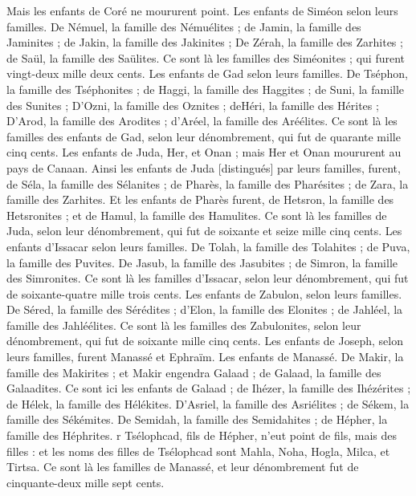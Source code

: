 \begin{multicols}{2}
Mais les enfants de Coré ne moururent point.
Les enfants de Siméon selon leurs familles. De Némuel, la famille des Némuélites ; de Jamin, la famille des Jaminites ; de Jakin, la famille des Jakinites ;
De Zérah, la famille des Zarhites ; de Saül, la famille des Saülites.
Ce sont là les familles des Siméonites ; qui furent vingt-deux mille deux cents.
Les enfants de Gad selon leurs familles. De Tséphon, la famille des Tséphonites ; de Haggi, la famille des Haggites ; de Suni, la famille des Sunites ;
D'Ozni, la famille des Oznites ; deHéri, la famille des Hérites ;
D'Arod, la famille des Arodites ; d'Aréel, la famille des Aréélites.
Ce sont là les familles des enfants de Gad, selon leur dénombrement, qui fut de quarante mille cinq cents.
Les enfants de Juda, Her, et Onan ; mais Her et Onan moururent au pays de Canaan.
Ainsi les enfants de Juda [distingués] par leurs familles, furent, de Séla, la famille des Sélanites ; de Pharès, la famille des Pharésites ; de Zara, la famille des Zarhites.
Et les enfants de Pharès furent, de Hetsron, la famille des Hetsronites ; et de Hamul, la famille des Hamulites.
Ce sont là les familles de Juda, selon leur dénombrement, qui fut de soixante et seize mille cinq cents.
Les enfants d'Issacar selon leurs familles. De Tolah, la famille des Tolahites ; de Puva, la famille des Puvites.
De Jasub, la famille des Jasubites ; de Simron, la famille des Simronites.
Ce sont là les familles d'Issacar, selon leur dénombrement, qui fut de soixante-quatre mille trois cents.
Les enfants de Zabulon, selon leurs familles. De Séred, la famille des Sérédites ; d'Elon, la famille des Elonites ; de Jahléel, la famille des Jahléélites.
Ce sont là les familles des Zabulonites, selon leur dénombrement, qui fut de soixante mille cinq cents.
Les enfants de Joseph, selon leurs familles, furent Manassé et Ephraïm.
Les enfants de Manassé. De Makir, la famille des Makirites ; et Makir engendra Galaad ; de Galaad, la famille des Galaadites.
Ce sont ici les enfants de Galaad ; de Ihézer, la famille des Ihézérites ; de Hélek, la famille des Hélékites.
D'Asriel, la famille des Asriélites ; de Sékem, la famille des Sékémites.
De Semidah, la famille des Semidahites ; de Hépher, la famille des Héphrites.
r Tsélophcad, fils de Hépher, n'eut point de fils, mais des filles : et les noms des filles de Tsélophcad sont Mahla, Noha, Hogla, Milca, et Tirtsa.
Ce sont là les familles de Manassé, et leur dénombrement fut de cinquante-deux mille sept cents.

\end{multicols}
